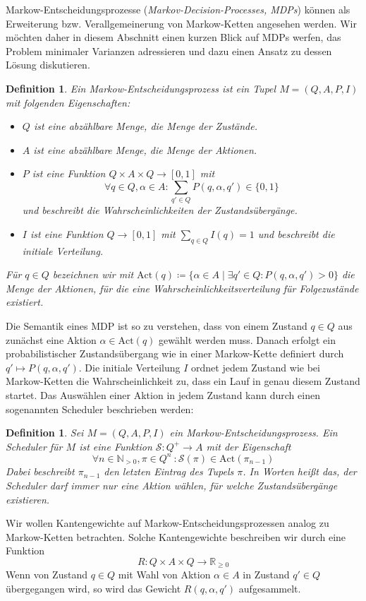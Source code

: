\documentclass[a4paper]{article}
\newcommand{\mc}{Markow-Kette}
\newtheorem{definition}[satz]{Definition} %
\theoremstyle{nonumberplain}
\begin{document}
Markow-Entscheidungsprozesse (\textit{Markov-Decision-Processes, MDPs}) können als Erweiterung bzw. Verallgemeinerung von \mc{}n angesehen werden. Wir möchten daher in diesem Abschnitt einen kurzen Blick auf MDPs werfen, das Problem minimaler Varianzen adressieren und dazu einen Ansatz zu dessen Lösung diskutieren.
\newcommand{\mdpex}{$M = (Q,A,P,I)$}
\newcommand{\mdp}{Markow-Entscheidungsprozess}
\begin{definition}
	Ein \mdp{} ist ein Tupel \mdpex{} mit folgenden Eigenschaften:
	\begin{itemize}
		\item $Q$ ist eine abzählbare Menge, die Menge der Zustände.
		\item $A$ ist eine abzählbare Menge, die Menge der Aktionen.
		\item $P$ ist eine Funktion $Q \times A \times Q \to [0,1]$ mit
		\[\forall q\in Q, \alpha\in A : \sum_{q' \in Q}{P(q,\alpha,q')} \in \{0,1\}\]
		und beschreibt die Wahrscheinlichkeiten der Zustandsübergänge.
		\item $I$ ist eine Funktion $Q \to [0,1]$ mit $\sum_{q \in Q}{I(q)} = 1$ und beschreibt die initiale Verteilung.
	\end{itemize}
	Für $q \in Q$ bezeichnen wir mit $\mathrm{Act}(q) \coloneqq \{\alpha \in A \mid \exists q' \in Q : P(q,\alpha,q') > 0\}$ die Menge der Aktionen, für die eine Wahrscheinlichkeitsverteilung für Folgezustände existiert.
\end{definition}
Die Semantik eines MDP ist so zu verstehen, dass von einem Zustand $q \in Q$ aus zunächst eine Aktion $\alpha \in \mathrm{Act}(q)$ gewählt werden muss. Danach erfolgt ein probabilistischer Zustandsübergang wie in einer \mc{} definiert durch $q' \mapsto P(q,\alpha,q')$. Die initiale Verteilung $I$ ordnet jedem Zustand wie bei \mc{}n die Wahrscheinlichkeit zu, dass ein Lauf in genau diesem Zustand startet.
Das Auswählen einer Aktion in jedem Zustand kann durch einen sogenannten Scheduler beschrieben werden:
\begin{definition}
	Sei \mdpex{} ein \mdp{}. Ein Scheduler für $M$ ist eine Funktion $\mathcal{S} : Q^+ \to A$ mit der Eigenschaft
	\[\forall n \in \mathbb{N}_{>0}, \pi \in Q^n\ : \mathcal{S}(\pi) \in \mathrm{Act}(\pi_{n-1})\]
	Dabei beschreibt $\pi_{n-1}$ den letzten Eintrag des Tupels $\pi$. In Worten heißt das, der Scheduler darf immer nur eine Aktion wählen, für welche Zustandsübergänge existieren.
\end{definition}

Wir wollen Kantengewichte auf \mdp{}en analog zu \mc{}n betrachten. Solche Kantengewichte beschreiben wir durch eine Funktion
\[R : Q \times A \times Q \to \mathbb{R}_{\geq 0} \]
Wenn von Zustand $q\in Q$ mit Wahl von Aktion $\alpha\in A$ in Zustand $q'\in Q$ übergegangen wird, so wird das Gewicht $R(q,\alpha,q')$ aufgesammelt.
\end{document}
